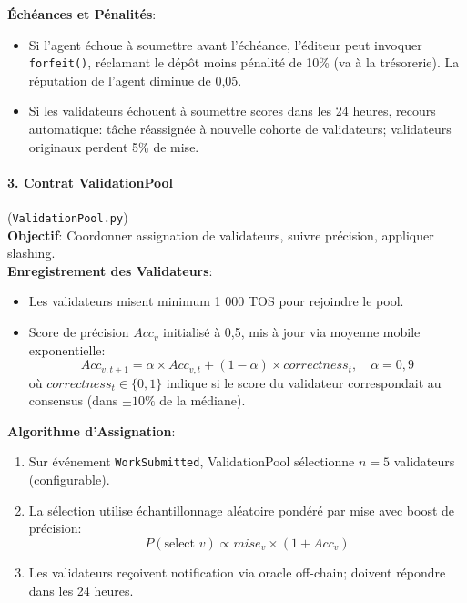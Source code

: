 \documentclass[11pt]{article}
\begin{document}
\textbf{Échéances et Pénalités}:
\begin{itemize}[noitemsep]
  \item Si l'agent échoue à soumettre avant l'échéance, l'éditeur peut invoquer \texttt{forfeit()}, réclamant le dépôt moins pénalité de 10\% (va à la trésorerie). La réputation de l'agent diminue de 0,05.
  \item Si les validateurs échouent à soumettre scores dans les 24 heures, recours automatique: tâche réassignée à nouvelle cohorte de validateurs; validateurs originaux perdent 5\% de mise.
\end{itemize}

\paragraph{3. Contrat ValidationPool} (\texttt{ValidationPool.py})\\
\textbf{Objectif}: Coordonner assignation de validateurs, suivre précision, appliquer slashing.\\
\textbf{Enregistrement des Validateurs}:
\begin{itemize}[noitemsep]
  \item Les validateurs misent minimum 1 000 TOS pour rejoindre le pool.
  \item Score de précision $Acc_v$ initialisé à 0,5, mis à jour via moyenne mobile exponentielle:
    \begin{equation}
    Acc_{v,t+1} = \alpha \times Acc_{v,t} + (1-\alpha) \times correctness_t, \quad \alpha = 0,9
    \end{equation}
    où $correctness_t \in \{0,1\}$ indique si le score du validateur correspondait au consensus (dans $\pm10\%$ de la médiane).
\end{itemize}
\textbf{Algorithme d'Assignation}:
\begin{enumerate}[noitemsep]
  \item Sur événement \texttt{WorkSubmitted}, ValidationPool sélectionne $n=5$ validateurs (configurable).
  \item La sélection utilise échantillonnage aléatoire pondéré par mise avec boost de précision:
    \begin{equation}
    P(\text{select } v) \propto mise_v \times (1 + Acc_v)
    \end{equation}
  \item Les validateurs reçoivent notification via oracle off-chain; doivent répondre dans les 24 heures.
\end{enumerate}
\end{document}
